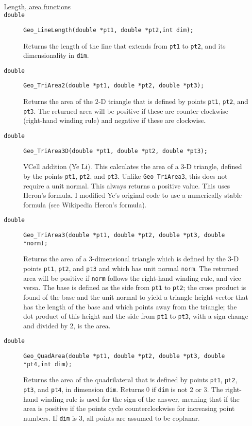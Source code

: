 \documentclass[11pt]{article}
\newcommand {\ttt} {\texttt}
\begin{document}
\begin{description}
\hfill \\
\item[\underline{Length, area functions}]

\item[\ttt{double}]
\ttt{Geo\_LineLength(double *pt1, double *pt2,int dim);}

Returns the length of the line that extends from \ttt{pt1} to \ttt{pt2}, and its dimensionality in \ttt{dim}.

\item[\ttt{double}]
\ttt{Geo\_TriArea2(double *pt1, double *pt2, double *pt3);}

Returns the area of the 2-D triangle that is defined by points \ttt{pt1}, \ttt{pt2}, and \ttt{pt3}. The returned area will be positive if these are counter-clockwise (right-hand winding rule) and negative if these are clockwise.

\item[\ttt{double}]
\ttt{Geo\_TriArea3D(double *pt1, double *pt2, double *pt3);}

VCell addition (Ye Li). This calculates the area of a 3-D triangle, defined by the points \ttt{pt1}, \ttt{pt2}, and \ttt{pt3}. Unlike \ttt{Geo\_TriArea3}, this does not require a unit normal. This always returns a positive value. This uses Heron's formula. I modified Ye's original code to use a numerically stable formula (see Wikipedia Heron's formula).

\item[\ttt{double}]
\ttt{Geo\_TriArea3(double *pt1, double *pt2, double *pt3, double *norm);}

Returns the area of a 3-dimensional triangle which is defined by the 3-D points \ttt{pt1}, \ttt{pt2}, and \ttt{pt3} and which has unit normal \ttt{norm}. The returned area will be positive if \ttt{norm} follows the right-hand winding rule, and vice versa.
The base is defined as the side from \ttt{pt1} to \ttt{pt2}; the cross product is found of the base and the unit normal to yield a triangle height vector that has the length of the base and which points away from the triangle; the dot product of this height and the side from \ttt{pt1} to \ttt{pt3}, with a sign change and divided by 2, is the area.

\item[\ttt{double}]
\ttt{Geo\_QuadArea(double *pt1, double *pt2, double *pt3, double *pt4,int dim);}

Returns the area of the quadrilateral that is defined by points \ttt{pt1}, \ttt{pt2}, \ttt{pt3}, and \ttt{pt4}, in dimension \ttt{dim}. Returns 0 if \ttt{dim} is not 2 or 3. The right-hand winding rule is used for the sign of the answer, meaning that if the area is positive if the points cycle counterclockwise for increasing point numbers. If \ttt{dim} is 3, all points are assumed to be coplanar.


\end{description}
\end{document}
